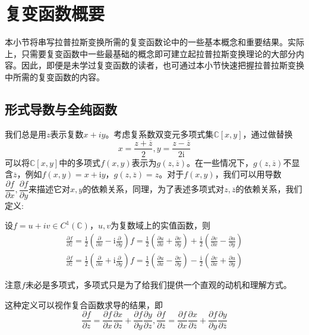 \section{复变函数概要}\label{sec:Complex}

本小节将串写拉普拉斯变换所需的复变函数论中的一些基本概念和重要结果\cite{Function_Theory}。实际上，只需要复变函数中一些最基础的概念即可建立起拉普拉斯变换理论的大部分内容。因此，即便是未学过复变函数的读者，也可通过本小节快速把握拉普拉斯变换中所需的复变函数的内容。

\subsection{形式导数与全纯函数}\label{sub:derivative_and_holomorphic}
我们总是用$z$表示复数$x+iy$。考虑复系数双变元多项式集$\mathbb{C}[x,y]$，通过做替换$$x=\frac{z+\overline{z}}{2},y=\frac{z-\overline{z}}{2\mathrm{i}}$$
可以将$\mathbb{C}[x,y]$中的多项式$f(x,y)$表示为$g(z,\overline{z})$。在一些情况下，$g(z,\overline{z})$不显含$\overline{z}$，例如$f(x,y)=x+\mathrm{i}y$，$g(z,\overline{z})=z$。对于$f(x,y)$，我们可以用导数$\dfrac{\partial f}{\partial x},\dfrac{\partial f}{\partial y}$来描述它对$x,y$的依赖关系，同理，为了表述多项式对$z,\overline{z}$的依赖关系，我们定义:\begin{definition}[形式导数]
    设$f=u+iv\in C^1(\mathbb{C})$，$u,v$为复数域上的实值函数，则
    \begin{align*}
        \frac{\partial f}{\partial z}=\frac{1}{2}\left(\frac{\partial}{\partial x}-\mathrm{i}\frac{\partial}{\partial y}\right)f=\frac{1}{2}\left(\frac{\partial u}{\partial x}+\frac{\partial v}{\partial y}\right)+\frac{\mathrm{i}}{2}\left(\frac{\partial v}{\partial x}-\frac{\partial u}{\partial y}\right)\\
        \frac{\partial f}{\partial \overline{z}}=\frac{1}{2}\left(\frac{\partial}{\partial x}+\mathrm{i}\frac{\partial}{\partial y}\right)f=\frac{1}{2}\left(\frac{\partial u}{\partial x}-\frac{\partial v}{\partial y}\right)-\frac{\mathrm{i}}{2}\left(\frac{\partial v}{\partial x}+\frac{\partial u}{\partial y}\right)
    \end{align*}
\end{definition}
注意$f$未必是多项式，多项式只是为了给我们提供一个直观的动机和理解方式。

这种定义可以视作复合函数求导的结果，即\[\frac{\partial f}{\partial z}=\frac{\partial f}{\partial x}\frac{\partial x}{\partial z}+\frac{\partial f}{\partial y}\frac{\partial y}{\partial z},\frac{\partial f}{\partial \overline{z}}=\frac{\partial f}{\partial x}\frac{\partial x}{\partial \overline{z}}+\frac{\partial f}{\partial y}\frac{\partial y}{\partial \overline{z}}\]

